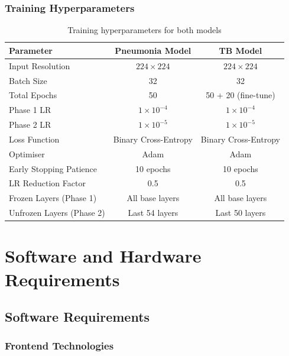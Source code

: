 \documentclass[12pt, a4paper, oneside]{report}
\begin{document}
\subsection{Training Hyperparameters}

\begin{table}[H]
\centering
\caption{Training hyperparameters for both models}
\label{tab:hyperparams}
\begin{tabular}{lcc}
\toprule
\textbf{Parameter} & \textbf{Pneumonia Model} & \textbf{TB Model} \\
\midrule
Input Resolution & $224 \times 224$ & $224 \times 224$ \\
Batch Size & 32 & 32 \\
Total Epochs & 50 & 50 + 20 (fine-tune) \\
Phase 1 LR & $1 \times 10^{-4}$ & $1 \times 10^{-4}$ \\
Phase 2 LR & $1 \times 10^{-5}$ & $1 \times 10^{-5}$ \\
Loss Function & Binary Cross-Entropy & Binary Cross-Entropy \\
Optimiser & Adam & Adam \\
Early Stopping Patience & 10 epochs & 10 epochs \\
LR Reduction Factor & 0.5 & 0.5 \\
Frozen Layers (Phase 1) & All base layers & All base layers \\
Unfrozen Layers (Phase 2) & Last 54 layers & Last 50 layers \\
\bottomrule
\end{tabular}
\end{table}

\chapter{Software and Hardware Requirements}
\label{chap:requirements}

\section{Software Requirements}
\label{sec:software_req}

\subsection{Frontend Technologies}
\end{document}
